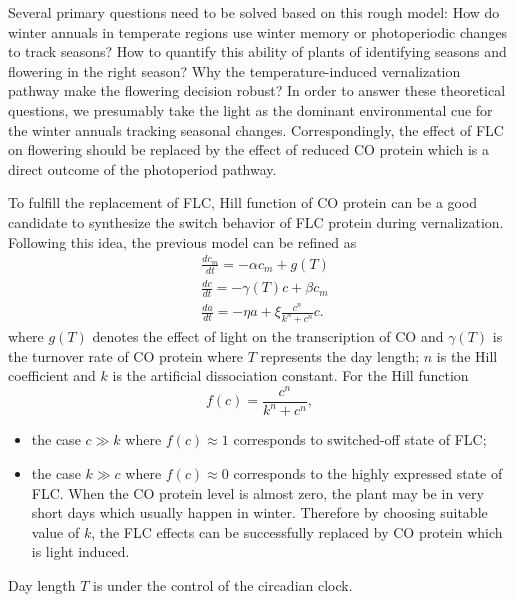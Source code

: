 \documentclass[paper=a4, fontsize=12pt]{scrartcl}	%
\numberwithin{equation}{section}					%
\numberwithin{figure}{section}					%
\numberwithin{table}{section}					%
\begin{document}
Several primary questions need to be solved based on this rough model: How do winter annuals in temperate regions use winter memory or photoperiodic changes to track seasons? How to quantify this ability of plants of identifying seasons and flowering in the right season? Why the temperature-induced vernalization pathway make the flowering decision robust? In order to answer these theoretical questions, we presumably take the light as the dominant environmental cue for the winter annuals tracking seasonal changes. Correspondingly, the effect of FLC on flowering should be replaced by the effect of reduced CO protein which is a direct outcome of the photoperiod pathway. 

To fulfill the replacement of FLC, Hill function of CO protein can be a good candidate to synthesize the switch behavior of FLC protein during vernalization. Following this idea, the previous model can be refined as
\begin{align}
&\frac{dc_m}{dt}=-\alpha c_m+g(T)\label{cm}\\
&\frac{dc}{dt}=-\gamma(T) c+\beta c_m\label{c}\\
&\frac{da}{dt}=-\eta a+\xi \frac{c^n}{k^n+c^n}c\label{a}.
\end{align}
where $g(T)$ denotes the effect of light on the transcription of CO and $\gamma(T)$ is the turnover rate of CO protein where $T$ represents the day length; $n$ is the Hill coefficient and $k$ is the artificial dissociation constant. For the Hill function
\begin{equation}
\nonumber f(c)=\frac{c^n}{k^n+c^n}, 
\end{equation}
\begin{itemize}
\item the case $c\gg k$ where $f(c)\approx 1$ corresponds to switched-off state of FLC;
\item the case $k\gg c$ where $f(c)\approx 0$ corresponds to the highly expressed state of FLC. When the CO protein level is almost zero, the plant may be in very short days which usually happen in winter. Therefore by choosing suitable value of $k$, the FLC effects can be successfully replaced by CO protein which is light induced. 
\end{itemize}
Day length $T$ is under the control of the circadian clock. 
\end{document}
